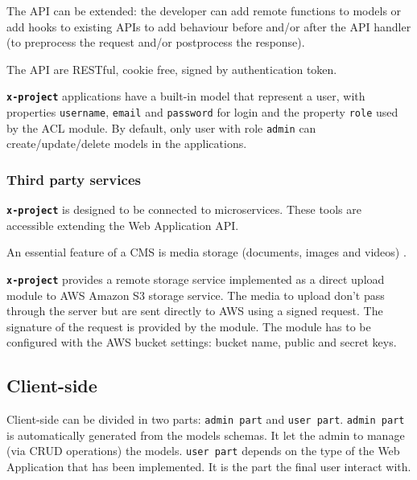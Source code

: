 \documentclass{sig-alternate}
\newcommand{\brand}[1]{\textbf{\tt #1}}
\begin{document}
The API can be extended: the developer can add remote functions to models or add hooks to existing APIs to add behaviour before and/or after the API handler (to preprocess the request and/or postprocess the response).

The API are RESTful, cookie free, signed by authentication token.

\brand{x-project} applications have a built-in model that represent a user, with properties \texttt{username}, \texttt{email} and \texttt{password} for login and the property \texttt{role} used by the ACL module.
By default, only user with role \texttt{admin} can create/update/delete models in the applications.


\subsubsection{Third party services}
\brand{x-project} is designed to be connected to microservices. These tools are accessible extending the Web Application API.

An essential feature of a CMS is media storage (documents, images and videos) \cite{5552271}. 

\brand{x-project} provides a remote storage service implemented as a direct upload module to AWS Amazon S3 storage service. The media to upload don’t pass through the server but are sent directly to AWS using a signed request.
The signature of the request is provided by the module.
The module has to be configured with the AWS bucket settings: bucket name, public and secret keys. 



\subsection{Client-side}

Client-side can be divided in two parts: \texttt{admin part} and \texttt{user part}.
\texttt{admin part} is automatically generated from the models schemas. It let the admin to manage (via CRUD operations) the models.
\texttt{user part} depends on the type of the Web Application that has been implemented.
It is the part the final user interact with.

\end{document}
